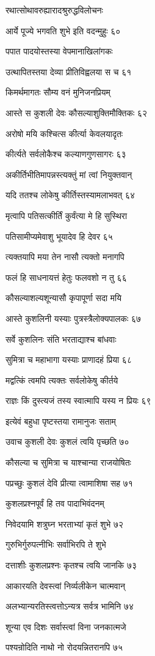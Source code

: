 रथात्सोथावरुह्यारादश्रुरुद्धविलोचनः

आर्ये पूज्ये भगवति शुभे इति वदन्मुहुः ६०

पपात पादयोस्तस्या वेपमानाखिलांगकः

उत्थापितस्तया देव्या प्रीतिविह्वलया स च ६१

किमर्थमागतः सौम्य वनं मुनिजनप्रियम्

आस्ते स कुशली देवः कौसल्याशुक्तिमौक्तिकः ६२

अरोषो मयि कश्चित्स कीर्त्या केवलयादृतः

कीर्त्यते सर्वलोकैश्च कल्याणगुणसागरः ६३

अकीर्तिभीतिमापन्नस्त्यक्तुं मां त्वां नियुक्तवान्

यदि ततश्च लोकेषु कीर्तिस्तस्यामलाभवत् ६४

मृत्वापि पतिसत्कीर्तिं कुर्वंत्या मे हि सुस्थिरा

पतिसामीप्यमेवाशु भूयादेव हि देवर ६५

त्यक्तयापि मया तेन नासौ त्यक्तो मनागपि

फलं हि साधनायत्तं हेतुः फलवशो न तु ६६

कौसल्याशल्यशून्यासौ कृपापूर्णा सदा मयि

आस्ते कुशलिनी यस्याः पुत्रस्त्रैलोक्यपालकः ६७

सर्वे कुशलिनः संति भरताद्याश्च बांधवाः

सुमित्रा च महाभागा यस्याः प्राणादहं प्रिया ६८

मद्वत्किं त्वमपि त्यक्तः सर्वलोकेषु कीर्तये

राज्ञः किं दुस्त्यजं तस्य स्वात्मापि यस्य न प्रियः ६९

इत्येवं बहुधा पृष्टस्तया रामानुजः सताम्

उवाच कुशली देवः कुशलं त्वयि पृच्छति ७०

कौसल्या च सुमित्रा च याश्चान्या राजयोषितः

पप्रच्छुः कुशलं देवि प्रीत्या त्वामाशिषा सह ७१

कुशलप्रश्नपूर्वं हि तव पादाभिवंदनम्

निवेदयामि शत्रुघ्न भरताभ्यां कृतं शुभे ७२

गुरुभिर्गुरुपत्नीभिः सर्वाभिरपि ते शुभे

दत्ताशीः कुशलप्रश्नः कृतश्च त्वयि जानकि ७३

आकारयति देवस्त्वां निर्व्यलीकेन चात्मवान्

अलभ्यान्यरतिस्त्वत्तोऽन्यत्र सर्वत्र भामिनि ७४

शून्या एव दिशः सर्वास्त्वां विना जनकात्मजे

पश्यन्रोदिति नाथो नो रोदयन्नितरानपि ७५

